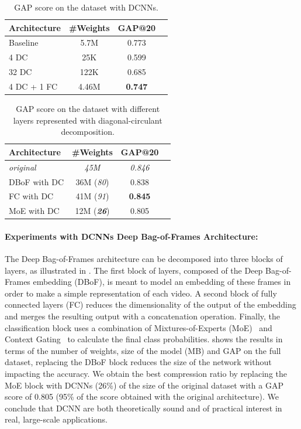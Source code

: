 \begin{table}
  \centering
  \begin{tabular}{lccc}
    \toprule
    \textbf{Architecture} & \textbf{\#Weights} & \textbf{GAP@20} \\
    \midrule
    Baseline    & 5.7M  & 0.773          \\
    4 DC        & 25K   & 0.599          \\
    32 DC       & 122K  & 0.685          \\
    4 DC + 1 FC & 4.46M & \textbf{0.747} \\
    \bottomrule
  \end{tabular}
  \caption{GAP score on the \yt dataset with DCNNs.}
  \label{table:youtube_agg_xp}
\end{table}

\begin{table}
  \centering
  \begin{tabular}{lccc}
  \toprule
  \textbf{Architecture} & \textbf{\#Weights} & \textbf{GAP@20} \\
  \midrule
  \textit{original} & \textit{45M} & \textit{0.846} \\
  DBoF with DC   & 36M (\textit{80}) & 0.838 \\
  FC with DC    & 41M (\textit{91}) & \textbf{0.845} \\
  MoE with DC   & 12M (\textit{\textbf{26}}) & 0.805 \\
  \bottomrule
  \end{tabular}
  \caption{GAP score on the \yt dataset with different layers represented with diagonal-circulant decomposition.}
  \label{table:youtube_full_xp}
\end{table}

\paragraph{Experiments with DCNNs Deep Bag-of-Frames Architecture:}
The Deep Bag-of-Frames architecture can be decomposed into three blocks of layers, as illustrated in .
The first block of layers, composed of the Deep Bag-of-Frames embedding (DBoF), is meant to model an embedding of these frames in order to make a simple representation of each video.
A second block of fully connected layers (FC) reduces the dimensionality of the output of the embedding and merges the resulting output with a concatenation operation.
Finally, the classification block uses a combination of Mixtures-of-Experts (MoE)~\cite{jordan1993hierarchical,abu2016youtube} and Context Gating~\cite{miech2017learnable} to calculate the final class probabilities.
 shows the results in terms of the number of weights, size of the model (MB) and GAP on the full dataset, replacing the DBoF block reduces the size of the network without impacting the accuracy.
We obtain the best compression ratio by replacing the MoE block with DCNNs (26\%) of the size of the original dataset with a GAP score of 0.805 (95\% of the score obtained with the original architecture).
We conclude that DCNN are both theoretically sound and of practical interest in real, large-scale applications.

